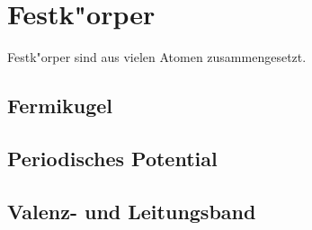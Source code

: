\chapter{Festk"orper\label{chapter:festkoerper}}
\rhead{}
Festk"orper sind aus vielen Atomen zusammengesetzt. 
\section{Fermikugel}

\section{Periodisches Potential}
\section{Valenz- und Leitungsband}
